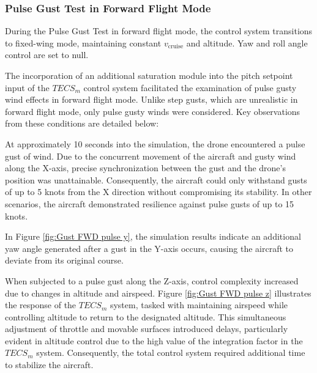 \subsubsection{Pulse Gust Test in Forward Flight Mode}

During the Pulse Gust Test in forward flight mode, the control system transitions to fixed-wing mode, maintaining constant $v_{\text{cruise}}$ and altitude. Yaw and roll angle control are set to null.

The incorporation of an additional saturation module into the pitch setpoint input of the $TECS_m$ control system facilitated the examination of pulse gusty wind effects in forward flight mode. Unlike step gusts, which are unrealistic in forward flight mode, only pulse gusty winds were considered. Key observations from these conditions are detailed below:

At approximately 10 seconds into the simulation, the drone encountered a pulse gust of wind. Due to the concurrent movement of the aircraft and gusty wind along the X-axis, precise synchronization between the gust and the drone's position was unattainable. Consequently, the aircraft could only withstand gusts of up to 5 knots from the X direction without compromising its stability. In other scenarios, the aircraft demonstrated resilience against pulse gusts of up to 15 knots.

In Figure \ref{fig:Gust FWD pulse y}, the simulation results indicate an additional yaw angle generated after a gust in the Y-axis occurs, causing the aircraft to deviate from its original course.

When subjected to a pulse gust along the Z-axis, control complexity increased due to changes in altitude and airspeed. Figure \ref{fig:Gust FWD pulse z} illustrates the response of the $TECS_m$ system, tasked with maintaining airspeed while controlling altitude to return to the designated altitude. This simultaneous adjustment of throttle and movable surfaces introduced delays, particularly evident in altitude control due to the high value of the integration factor in the $TECS_m$ system. Consequently, the total control system required additional time to stabilize the aircraft.

